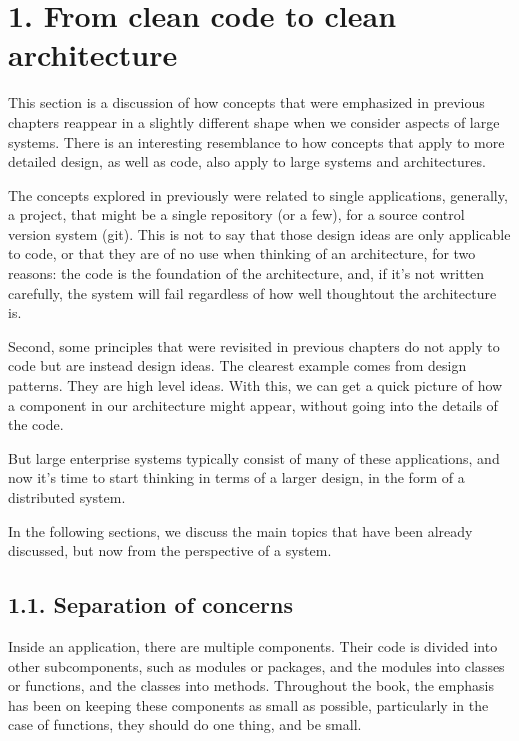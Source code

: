 \documentclass[a4paper,10pt,english]{sphinxmanual}
\begin{document}
\section{1. From clean code to clean architecture}
\label{\detokenize{chapters/10_clean_architecture/index:from-clean-code-to-clean-architecture}}
This section is a discussion of how concepts that were emphasized in previous chapters
reappear in a slightly different shape when we consider aspects of large systems. There is
an interesting resemblance to how concepts that apply to more detailed design, as well as
code, also apply to large systems and architectures.

The concepts explored in previously were related to single applications, generally, a
project, that might be a single repository (or a few), for a source control version system (git).
This is not to say that those design ideas are only applicable to code, or that they are of no
use when thinking of an architecture, for two reasons: the code is the foundation of the
architecture, and, if it’s not written carefully, the system will fail regardless of how well
thought\sphinxhyphen{}out the architecture is.

Second, some principles that were revisited in previous chapters do not apply to code but
are instead design ideas. The clearest example comes from design patterns. They are high\sphinxhyphen{}
level ideas. With this, we can get a quick picture of how a component in our architecture
might appear, without going into the details of the code.

But large enterprise systems typically consist of many of these applications, and now it’s
time to start thinking in terms of a larger design, in the form of a distributed system.

In the following sections, we discuss the main topics that have been already discussed, but now from the
perspective of a system.


\subsection{1.1. Separation of concerns}
\label{\detokenize{chapters/10_clean_architecture/index:separation-of-concerns}}
Inside an application, there are multiple components. Their code is divided into other
subcomponents, such as modules or packages, and the modules into classes or functions,
and the classes into methods. Throughout the book, the emphasis has been on keeping
these components as small as possible, particularly in the case of functions, they
should do one thing, and be small.
\end{document}
